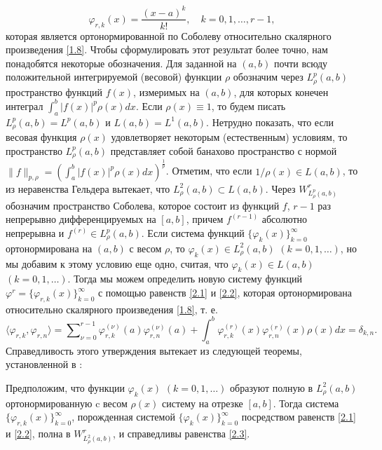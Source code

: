\begin{equation}\label{2.2}
\varphi_{r,k}(x) =\frac{(x-a)^k}{k!}, \quad k=0,1,\ldots, r-1,
\end{equation}
которая является   ортонормированной по Соболеву относительно скалярного произведения \eqref{1.8}. Чтобы сформулировать  этот результат более точно, нам понадобятся некоторые обозначения. Для заданной на $(a,b)$ почти всюду положительной интегрируемой  (весовой) функции $\rho$ обозначим через $L^p_\rho(a,b)$  пространство  функций $f(x)$, измеримых  на  $(a,b)$, для которых конечен интеграл $\int_a^b|f(x)|^p\rho(x)dx$. Если $\rho(x)\equiv1$, то будем писать $L^p_\rho(a,b)=L^p(a,b)$ и $L(a,b)=L^1(a,b)$. Нетрудно показать, что если весовая функция $\rho(x)$ удовлетворяет некоторым (естественным) условиям, то пространство $L^p_\rho(a,b)$ представляет собой банахово пространство с нормой $\|f\|_{p,\rho}=(\int_a^b|f(x)|^p\rho(x)dx)^\frac1p$. Отметим, что если $1/\rho(x)\in L(a,b)$, то из  неравенства Гельдера вытекает, что $L^2_\rho(a,b)\subset L(a,b)$. Через $W^r_{L^p_\rho(a,b)}$ обозначим пространство Соболева, которое состоит из функций $f$, $r-1$ раз непрерывно дифференцируемых на $[a,b]$, причем $f^{(r-1)}$ абсолютно непрерывна и  $f^{(r)}\in L^p_\rho(a,b)$. Если система функций $\{\varphi_k(x)\}_{k=0}^\infty$ ортонормирована на $(a,b)$ с весом $\rho$, то $\varphi_k(x)\in L^2_\rho(a,b)$ $(k=0,1,\ldots)$, но мы добавим к этому условию еще одно, считая, что $\varphi_k(x)\in L(a,b)$ $(k=0,1,\ldots)$. Тогда мы можем определить новую систему функций $\varphi^r=\{\varphi_{r,k}(x)\}_{k=0}^\infty$ с помощью равенств \eqref{2.1} и \eqref{2.2}, которая ортонормирована относительно скалярного произведения \eqref{1.8}, т. е.
\begin{equation}\label{2.3}
\langle\varphi_{r,k},\varphi_{r,n}\rangle=\sum\nolimits_{\nu=0}^{r-1}\varphi_{r,k}^{(\nu)}(a)\varphi_{r,n}^{(\nu)}(a)+
\int_{a}^{b}\varphi_{r,k}^{(r)}(x)\varphi_{r,n}^{(r)}(x)\rho(x)dx=\delta_{k,n}.
\end{equation}
Справедливость этого утверждения вытекает из следующей теоремы,   установленной в \cite{SharIzv2018}:
\begin{theorem}\label{th1} Предположим, что    функции $\varphi_k(x)$ $(k=0,1,\ldots)$ образуют полную в $L^2_\rho(a,b)$ ортонормированную   c весом   $\rho(x)$ систему на отрезке $[a,b]$. Тогда система $\{\varphi_{r,k}(x)\}_{k=0}^\infty$, порожденная системой $\{\varphi_{k}(x)\}_{k=0}^\infty$ посредством равенств \eqref{2.1} и \eqref{2.2}, полна  в $W^r_{L^2_\rho(a,b)}$, и справедливы равенства \eqref{2.3}.
\end{theorem}

